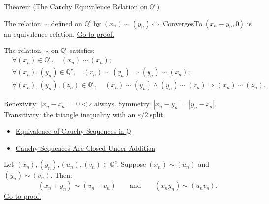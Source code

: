 \begin{theorembox}{Theorem (The Cauchy Equivalence Relation on $\mathbb{Q}^c$)}
\begin{theorem}
\label{thm:cauchy-equivalence-is-equivalence}
The relation $\sim$ defined on $\mathbb{Q}^c$ by
$(x_n) \sim (y_n) \Longleftrightarrow \operatorname{ConvergesTo}(x_n - y_n, 0)$
is an equivalence relation.
\hyperref[prf:cauchy-equivalence-is-equivalence]{Go to proof.}
\end{theorem}
\end{theorembox}

\begin{remark*}
The relation $\sim$ on $\mathbb{Q}^c$ satisfies:
\begin{align*}
&\forall (x_n) \in \mathbb{Q}^c,\quad (x_n) \sim (x_n); \\
&\forall (x_n),(y_n) \in \mathbb{Q}^c,\quad
  (x_n) \sim (y_n) \Longrightarrow (y_n) \sim (x_n); \\
&\forall (x_n),(y_n),(z_n) \in \mathbb{Q}^c,\quad
  (x_n) \sim (y_n) \land (y_n) \sim (z_n)
  \Longrightarrow (x_n) \sim (z_n).
\end{align*}
\end{remark*}

\begin{remark*}[Interpretation]
Reflexivity: $|x_n - x_n| = 0 < \varepsilon$ always.
Symmetry: $|x_n - y_n| = |y_n - x_n|$.
Transitivity: the triangle inequality with an $\varepsilon/2$ split.
\end{remark*}

\begin{remark*}[Dependencies]
\begin{itemize}
  \item \hyperref[def:cauchy-equivalence]{Equivalence of Cauchy Sequences in $\mathbb{Q}$}
  \item \hyperref[thm:cauchy-closed-operations-q]{Cauchy Sequences Are Closed Under Addition}
\end{itemize}
\end{remark*}

\begin{theorem}
\label{thm:cauchy-equiv-preserved-operations}
Let $(x_n),(y_n),(u_n),(v_n) \in \mathbb{Q}^c$.
Suppose $(x_n) \sim (u_n)$ and $(y_n) \sim (v_n)$.  Then:
\[
(x_n + y_n) \sim (u_n + v_n)
\qquad\text{and}\qquad
(x_n y_n) \sim (u_n v_n).
\]
\hyperref[prf:cauchy-equiv-preserved-operations]{Go to proof.}
\end{theorem}

